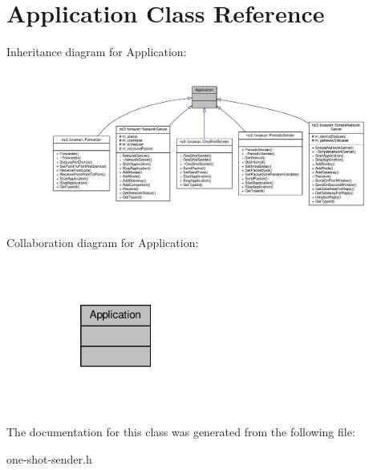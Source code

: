 \hypertarget{classApplication}{}\section{Application Class Reference}
\label{classApplication}


Inheritance diagram for Application\+:
\nopagebreak
\begin{figure}[H]
\begin{center}
\leavevmode
\includegraphics[width=350pt]{classApplication__inherit__graph}
\end{center}
\end{figure}


Collaboration diagram for Application\+:
\nopagebreak
\begin{figure}[H]
\begin{center}
\leavevmode
\includegraphics[width=145pt]{classApplication__coll__graph}
\end{center}
\end{figure}


The documentation for this class was generated from the following file\+:\begin{DoxyCompactItemize}
\item 
one-\/shot-\/sender.\+h\end{DoxyCompactItemize}
